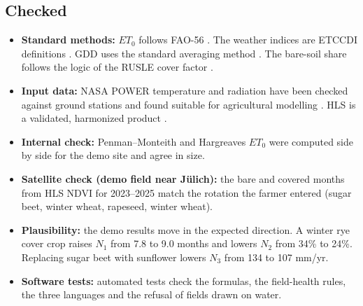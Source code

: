 \documentclass[11pt,a4paper]{article}
\begin{document}
\subsection*{Checked}
\begin{itemize}
\item \textbf{Standard methods:} $ET_0$ follows FAO-56 \cite{fao56}. The weather indices are ETCCDI definitions \cite{zhang2011}. GDD uses the standard averaging method \cite{mcmaster1997}. The bare-soil share follows the logic of the RUSLE cover factor \cite{wischmeier1978,panagos2015}.
\item \textbf{Input data:} NASA POWER temperature and radiation have been checked against ground stations and found suitable for agricultural modelling \cite{white2008,white2011}. HLS is a validated, harmonized product \cite{claverie2018}.
\item \textbf{Internal check:} Penman--Monteith and Hargreaves $ET_0$ were computed side by side for the demo site and agree in size.
\item \textbf{Satellite check (demo field near J\"ulich):} the bare and covered months from HLS NDVI for 2023--2025 match the rotation the farmer entered (sugar beet, winter wheat, rapeseed, winter wheat).
\item \textbf{Plausibility:} the demo results move in the expected direction. A winter rye cover crop raises $N_1$ from 7.8 to 9.0 months and lowers $N_2$ from 34\% to 24\%. Replacing sugar beet with sunflower lowers $N_3$ from 134 to 107 mm/yr.
\item \textbf{Software tests:} automated tests check the formulas, the field-health rules, the three languages and the refusal of fields drawn on water.
\end{itemize}
\end{document}
